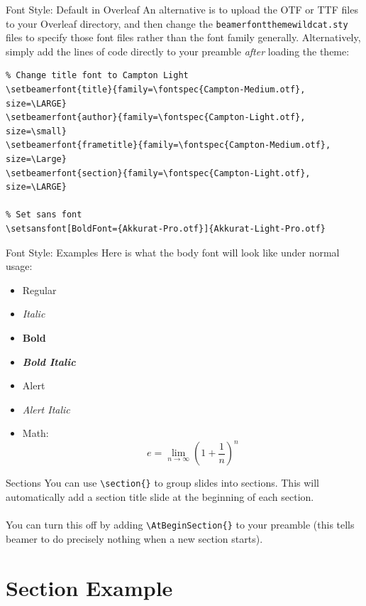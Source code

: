 \documentclass[aspectratio=1610]{beamer}
\begin{document}
\begin{frame}[fragile]{Font Style: Default in Overleaf}
    An alternative is to upload the OTF or TTF files to your Overleaf directory, and then change the \texttt{beamerfontthemewildcat.sty} files to specify those font files rather than the font family generally. Alternatively, simply add the lines of code directly to your preamble \textit{after} loading the theme:
    \footnotesize
    \begin{verbatim}
% Change title font to Campton Light
\setbeamerfont{title}{family=\fontspec{Campton-Medium.otf}, size=\LARGE}
\setbeamerfont{author}{family=\fontspec{Campton-Light.otf}, size=\small}
\setbeamerfont{frametitle}{family=\fontspec{Campton-Medium.otf}, size=\Large}
\setbeamerfont{section}{family=\fontspec{Campton-Light.otf}, size=\LARGE}

% Set sans font
\setsansfont[BoldFont={Akkurat-Pro.otf}]{Akkurat-Light-Pro.otf}
    \end{verbatim}
\end{frame}

\begin{frame}{Font Style: Examples}
    Here is what the body font will look like under normal usage:
    \begin{itemize}
        \item Regular
        \item \textit{Italic}
        \item \textbf{Bold}
        \item \textbf{\textit{Bold Italic}}
        \item \alert{Alert}
        \item \alert{\textit{Alert Italic}}
        \item Math: $$e = \lim_{n \rightarrow \infty}\left(1+\frac{1}{n}\right)^{n}$$
    \end{itemize}
\end{frame}

\begin{frame}{Sections}
    You can use \texttt{\textbackslash section\{\}} to group slides into sections. This will automatically add a section title slide at the beginning of each section.
    \\ ~ \\
    You can turn this off by adding \texttt{\textbackslash AtBeginSection\{\}} to your preamble (this tells beamer to do precisely nothing when a new section starts).
\end{frame}


\section{Section Example}
\end{document}
